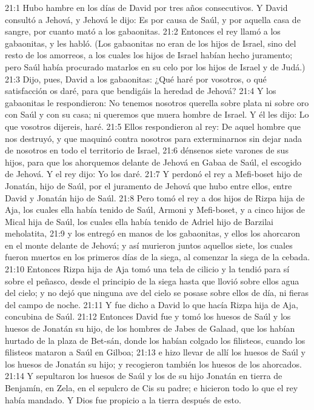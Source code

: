 21:1 Hubo hambre en los días de David por tres años consecutivos. Y David consultó a Jehová, y Jehová le dijo: Es por causa de Saúl, y por aquella casa de sangre, por cuanto mató a los gabaonitas.  
21:2 Entonces el rey llamó a los gabaonitas, y les habló. (Los gabaonitas no eran de los hijos de Israel, sino del resto de los amorreos, a los cuales los hijos de Israel habían hecho juramento; pero Saúl había procurado matarlos en su celo por los hijos de Israel y de Judá.)  
21:3 Dijo, pues, David a los gabaonitas: ¿Qué haré por vosotros, o qué satisfacción os daré, para que bendigáis la heredad de Jehová?  
21:4 Y los gabaonitas le respondieron: No tenemos nosotros querella sobre plata ni sobre oro con Saúl y con su casa; ni queremos que muera hombre de Israel. Y él les dijo: Lo que vosotros dijereis, haré.  
21:5 Ellos respondieron al rey: De aquel hombre que nos destruyó, y que maquinó contra nosotros para exterminarnos sin dejar nada de nosotros en todo el territorio de Israel,  
21:6 dénsenos siete varones de sus hijos, para que los ahorquemos delante de Jehová en Gabaa de Saúl, el escogido de Jehová. Y el rey dijo: Yo los daré.  
21:7 Y perdonó el rey a Mefi-boset hijo de Jonatán, hijo de Saúl, por el juramento de Jehová que hubo entre ellos, entre David y Jonatán hijo de Saúl. 
21:8 Pero tomó el rey a dos hijos de Rizpa hija de Aja, los cuales ella había tenido de Saúl, Armoni y Mefi-boset, y a cinco hijos de Mical hija de Saúl, los cuales ella había tenido de Adriel hijo de Barzilai meholatita, 
21:9 y los entregó en manos de los gabaonitas, y ellos los ahorcaron en el monte delante de Jehová; y así murieron juntos aquellos siete, los cuales fueron muertos en los primeros días de la siega, al comenzar la siega de la cebada.  
21:10 Entonces Rizpa hija de Aja tomó una tela de cilicio y la tendió para sí sobre el peñasco, desde el principio de la siega hasta que llovió sobre ellos agua del cielo; y no dejó que ninguna ave del cielo se posase sobre ellos de día, ni fieras del campo de noche.  
21:11 Y fue dicho a David lo que hacía Rizpa hija de Aja, concubina de Saúl.  
21:12 Entonces David fue y tomó los huesos de Saúl y los huesos de Jonatán su hijo, de los hombres de Jabes de Galaad, que los habían hurtado de la plaza de Bet-sán, donde los habían colgado los filisteos, cuando los filisteos mataron a Saúl en Gilboa; 
21:13 e hizo llevar de allí los huesos de Saúl y los huesos de Jonatán su hijo; y recogieron también los huesos de los ahorcados.  
21:14 Y sepultaron los huesos de Saúl y los de su hijo Jonatán en tierra de Benjamín, en Zela, en el sepulcro de Cis su padre; e hicieron todo lo que el rey había mandado. Y Dios fue propicio a la tierra después de esto.  
